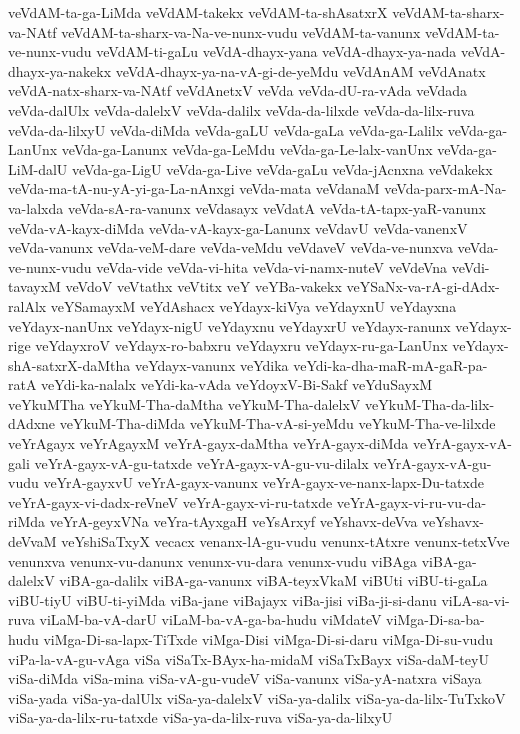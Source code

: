 {veVdAM-ta-ga-LiMda
veVdAM-takekx
veVdAM-ta-shAsatxrX
veVdAM-ta-sharx-va-NAtf
veVdAM-ta-sharx-va-Na-ve-nunx-vudu
veVdAM-ta-vanunx
veVdAM-ta-ve-nunx-vudu
veVdAM-ti-gaLu
veVdA-dhayx-yana
veVdA-dhayx-ya-nada
veVdA-dhayx-ya-nakekx
veVdA-dhayx-ya-na-vA-gi-de-yeMdu
veVdAnAM
veVdAnatx
veVdA-natx-sharx-va-NAtf
veVdAnetxV
veVda
veVda-dU-ra-vAda
veVdada
veVda-dalUlx
veVda-dalelxV
veVda-dalilx
veVda-da-lilxde
veVda-da-lilx-ruva
veVda-da-lilxyU
veVda-diMda
veVda-gaLU
veVda-gaLa
veVda-ga-Lalilx
veVda-ga-LanUnx
veVda-ga-Lanunx
veVda-ga-LeMdu
veVda-ga-Le-lalx-vanUnx
veVda-ga-LiM-dalU
veVda-ga-LigU
veVda-ga-Live
veVda-gaLu
veVda-jAcnxna
veVdakekx
veVda-ma-tA-nu-yA-yi-ga-La-nAnxgi
veVda-mata
veVdanaM
veVda-parx-mA-Na-va-lalxda
veVda-sA-ra-vanunx
veVdasayx
veVdatA
veVda-tA-tapx-yaR-vanunx
veVda-vA-kayx-diMda
veVda-vA-kayx-ga-Lanunx
veVdavU
veVda-vanenxV
veVda-vanunx
veVda-veM-dare
veVda-veMdu
veVdaveV
veVda-ve-nunxva
veVda-ve-nunx-vudu
veVda-vide
veVda-vi-hita
veVda-vi-namx-nuteV
veVdeVna
veVdi-tavayxM
veVdoV
veVtathx
veVtitx
veY
veYBa-vakekx
veYSaNx-va-rA-gi-dAdx-ralAlx
veYSamayxM
veYdAshacx
veYdayx-kiVya
veYdayxnU
veYdayxna
veYdayx-nanUnx
veYdayx-nigU
veYdayxnu
veYdayxrU
veYdayx-ranunx
veYdayx-rige
veYdayxroV
veYdayx-ro-babxru
veYdayxru
veYdayx-ru-ga-LanUnx
veYdayx-shA-satxrX-daMtha
veYdayx-vanunx
veYdika
veYdi-ka-dha-maR-mA-gaR-pa-ratA
veYdi-ka-nalalx
veYdi-ka-vAda
veYdoyxV-Bi-Sakf
veYduSayxM
veYkuMTha
veYkuM-Tha-daMtha
veYkuM-Tha-dalelxV
veYkuM-Tha-da-lilx-dAdxne
veYkuM-Tha-diMda
veYkuM-Tha-vA-si-yeMdu
veYkuM-Tha-ve-lilxde
veYrAgayx
veYrAgayxM
veYrA-gayx-daMtha
veYrA-gayx-diMda
veYrA-gayx-vA-gali
veYrA-gayx-vA-gu-tatxde
veYrA-gayx-vA-gu-vu-dilalx
veYrA-gayx-vA-gu-vudu
veYrA-gayxvU
veYrA-gayx-vanunx
veYrA-gayx-ve-nanx-lapx-Du-tatxde
veYrA-gayx-vi-dadx-reVneV
veYrA-gayx-vi-ru-tatxde
veYrA-gayx-vi-ru-vu-da-riMda
veYrA-geyxVNa
veYra-tAyxgaH
veYsArxyf
veYshavx-deVva
veYshavx-deVvaM
veYshiSaTxyX
vecacx
venanx-lA-gu-vudu
venunx-tAtxre
venunx-tetxVve
venunxva
venunx-vu-danunx
venunx-vu-dara
venunx-vudu
viBAga
viBA-ga-dalelxV
viBA-ga-dalilx
viBA-ga-vanunx
viBA-teyxVkaM
viBUti
viBU-ti-gaLa
viBU-tiyU
viBU-ti-yiMda
viBa-jane
viBajayx
viBa-jisi
viBa-ji-si-danu
viLA-sa-vi-ruva
viLaM-ba-vA-darU
viLaM-ba-vA-ga-ba-hudu
viMdateV
viMga-Di-sa-ba-hudu
viMga-Di-sa-lapx-TiTxde
viMga-Disi
viMga-Di-si-daru
viMga-Di-su-vudu
viPa-la-vA-gu-vAga
viSa
viSaTx-BAyx-ha-midaM
viSaTxBayx
viSa-daM-teyU
viSa-diMda
viSa-mina
viSa-vA-gu-vudeV
viSa-vanunx
viSa-yA-natxra
viSaya
viSa-yada
viSa-ya-dalUlx
viSa-ya-dalelxV
viSa-ya-dalilx
viSa-ya-da-lilx-TuTxkoV
viSa-ya-da-lilx-ru-tatxde
viSa-ya-da-lilx-ruva
viSa-ya-da-lilxyU
}
